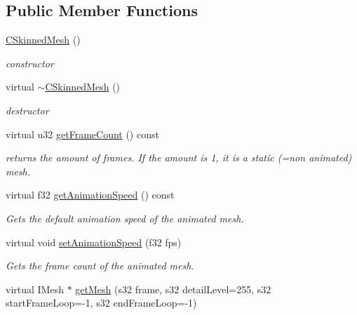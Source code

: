 \subsection*{Public Member Functions}
\begin{DoxyCompactItemize}
\item 
\hypertarget{classirr_1_1scene_1_1_c_skinned_mesh_a7a24142fadbcc307bd441597b9acbad5}{\hyperlink{classirr_1_1scene_1_1_c_skinned_mesh_a7a24142fadbcc307bd441597b9acbad5}{C\-Skinned\-Mesh} ()}\label{classirr_1_1scene_1_1_c_skinned_mesh_a7a24142fadbcc307bd441597b9acbad5}

\begin{DoxyCompactList}\small\item\em constructor \end{DoxyCompactList}\item 
\hypertarget{classirr_1_1scene_1_1_c_skinned_mesh_aa5bd846957f3f1d626685eafb8267891}{virtual \hyperlink{classirr_1_1scene_1_1_c_skinned_mesh_aa5bd846957f3f1d626685eafb8267891}{$\sim$\-C\-Skinned\-Mesh} ()}\label{classirr_1_1scene_1_1_c_skinned_mesh_aa5bd846957f3f1d626685eafb8267891}

\begin{DoxyCompactList}\small\item\em destructor \end{DoxyCompactList}\item 
\hypertarget{classirr_1_1scene_1_1_c_skinned_mesh_a3c5a5ea413c8c70a92a287adef0587d4}{virtual u32 \hyperlink{classirr_1_1scene_1_1_c_skinned_mesh_a3c5a5ea413c8c70a92a287adef0587d4}{get\-Frame\-Count} () const }\label{classirr_1_1scene_1_1_c_skinned_mesh_a3c5a5ea413c8c70a92a287adef0587d4}

\begin{DoxyCompactList}\small\item\em returns the amount of frames. If the amount is 1, it is a static (=non animated) mesh. \end{DoxyCompactList}\item 
virtual f32 \hyperlink{classirr_1_1scene_1_1_c_skinned_mesh_a31a4f60a11d1cbab2405ef8fa51932d9}{get\-Animation\-Speed} () const 
\begin{DoxyCompactList}\small\item\em Gets the default animation speed of the animated mesh. \end{DoxyCompactList}\item 
virtual void \hyperlink{classirr_1_1scene_1_1_c_skinned_mesh_ab882bbc374b7376e9f476eda9f85e9ee}{set\-Animation\-Speed} (f32 fps)
\begin{DoxyCompactList}\small\item\em Gets the frame count of the animated mesh. \end{DoxyCompactList}\item 
\hypertarget{classirr_1_1scene_1_1_c_skinned_mesh_a43d4fa8eb4b60c5cae247ab9df38df04}{virtual I\-Mesh $\ast$ \hyperlink{classirr_1_1scene_1_1_c_skinned_mesh_a43d4fa8eb4b60c5cae247ab9df38df04}{get\-Mesh} (s32 frame, s32 detail\-Level=255, s32 start\-Frame\-Loop=-\/1, s32 end\-Frame\-Loop=-\/1)}\label{classirr_1_1scene_1_1_c_skinned_mesh_a43d4fa8eb4b60c5cae247ab9df38df04}


\end{DoxyCompactItemize}
